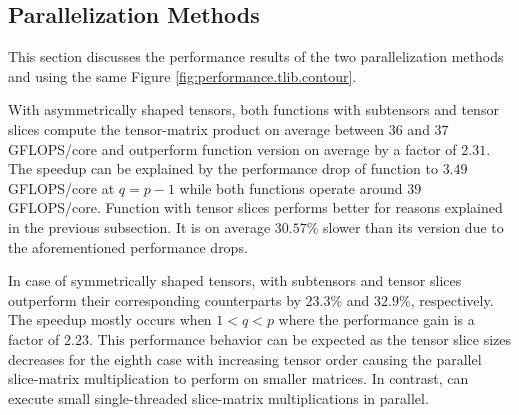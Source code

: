 
\subsection{Parallelization Methods}
This section discusses the performance results of the two parallelization methods  and  using the same Figure \ref{fig:performance.tlib.contour}.

With asymmetrically shaped tensors, both  functions with subtensors and tensor slices compute the tensor-matrix product on average between $36$ and $37$ GFLOPS/core and outperform function \allowbreak{} version on average by a factor of $2.31$.
The speedup can be explained by the performance drop of function \allowbreak{} to $3.49$ GFLOPS/core at $q=p-1$ while both  functions operate around $39$ GFLOPS/core.
Function  with tensor slices performs better for reasons explained in the previous subsection.
It is on average $30.57$\% slower than its  version due to the aforementioned performance drops.

In case of symmetrically shaped tensors,  with subtensors and tensor slices outperform their corresponding  counterparts by $23.3$\% and $32.9$\%, respectively.
The speedup mostly occurs when $1<q<p$ where the performance gain is a factor of $2.23$.
This performance behavior can be expected as the tensor slice sizes decreases for the eighth case with increasing tensor order causing the parallel slice-matrix multiplication to perform on smaller matrices.
In contrast,  can execute small single-threaded slice-matrix multiplications in parallel.




